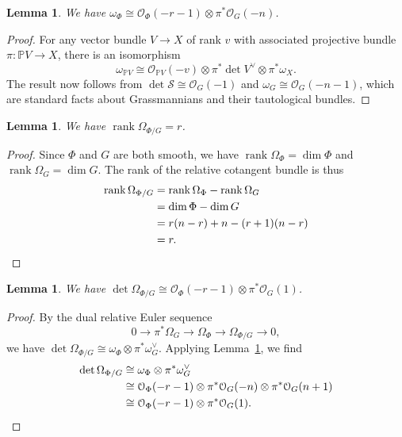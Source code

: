 \documentclass[12pt]{amsart}
\numberwithin{equation}{section}
\theoremstyle{plain}
\newtheorem{lem}[thm]{Lemma}
\theoremstyle{definition}
\newcommand{\mb}[1]{\mathbb{#1}}
\newcommand{\mc}[1]{\mathcal{#1}}
\newcommand{\rank}{\operatorname{rank}}
\begin{document}
\begin{lem}\label{lem:canonical bundle Phi}
    We have $\omega_\Phi\cong\mc{O}_\Phi(-r-1)\otimes\pi^*\mc{O}_G(-n)$.
\end{lem}
\begin{proof}
    For any vector bundle $V\to X$ of rank $v$ with associated projective bundle $\pi\colon \mb{P}V\to X$, there is an isomorphism
    \[\omega_{\mb{P}V}\cong\mc{O}_{\mb{P}V}(-v)\otimes\pi^*\det V^\vee\otimes\pi^*\omega_X.\]
    The result now follows from $\det\mc{S}\cong\mc{O}_G(-1)$ and $\omega_G\cong\mc{O}_G(-n-1)$, which are standard facts about Grassmannians and their tautological bundles.
\end{proof}

\begin{lem}\label{lem:rel cotangent bundle Phi}
    We have $\rank\Omega_{\Phi/G}=r$.
\end{lem}
\begin{proof}
    Since $\Phi$ and $G$ are both smooth, we have $\rank\Omega_\Phi=\dim\Phi$ and $\rank\Omega_G=\dim{G}$. The rank of the relative cotangent bundle is thus
    \begin{align*}
        \rank\Omega_{\Phi/G}&=\rank\Omega_\Phi-\rank\Omega_G\\
        &=\dim\Phi-\dim G\\
        &=r(n-r)+n-(r+1)(n-r)\\
        &=r.\qedhere
    \end{align*}
\end{proof}

\begin{lem}\label{lem:det Omega}
    We have $\det\Omega_{\Phi/G}\cong\mc{O}_\Phi(-r-1)\otimes\pi^*\mc{O}_G(1)$.
\end{lem}
\begin{proof}
    By the dual relative Euler sequence
    \[0\to \pi^*\Omega_G\to\Omega_\Phi\to\Omega_{\Phi/G}\to 0,\]
    we have $\det\Omega_{\Phi/G}\cong\omega_\Phi\otimes\pi^*\omega_G^\vee$. Applying Lemma~\ref{lem:canonical bundle Phi}, we find
    \begin{align*}
        \det\Omega_{\Phi/G}&\cong\omega_\Phi\otimes\pi^*\omega_G^\vee\\
        &\cong\mc{O}_\Phi(-r-1)\otimes\pi^*\mc{O}_G(-n)\otimes\pi^*\mc{O}_G(n+1)\\
        &\cong\mc{O}_\Phi(-r-1)\otimes\pi^*\mc{O}_G(1).\qedhere
    \end{align*}
\end{proof}
\end{document}
